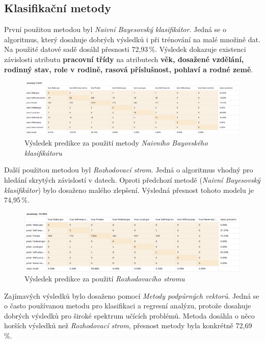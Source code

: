 \documentclass[11pt,a4paper,titlepage]{article}
\begin{document}
        \subsection{Klasifikační metody}
            První použitou metodou byl \textit{Naivní Bayesovský klasifikátor}. Jedná se o algoritmus, který dosahuje dobrých výsledků i při trénování na malé množině dat. Na použité datové sadě dosáhl přesnosti 72,93\,\%. Výsledek dokazuje existenci závislosti atributu \textbf{pracovní třídy} na atributech \textbf{věk, dosažené vzdělání, rodinný stav, role v rodině, rasová příslušnost, pohlaví a rodné země}.
            
            \begin{figure}[H]
                \centering
                \includegraphics[width=1\textwidth]{./img/bayes_novy.png}
                \caption{Výsledek predikce za použití metody \textit{Naivního Bayovského klasifikátoru}}
            \end{figure}

            Další použitou metodou byl \textit{Rozhodovací strom}. Jedná o algoritmus vhodný pro hledání skrytých závislostí v datech. Oproti předchozí metodě (\textit{Naivní Bayesovský klasifikátor}) bylo dosaženo malého zlepšení. Výsledná přesnost tohoto modelu je 74,95\,\%.
            
            \begin{figure}[H]
                \centering
                \includegraphics[width=1\textwidth]{./img/presnost_tree.png}
                \caption{Výsledek predikce za použití \textit{Rozhodovacího stromu}}
            \end{figure}

            Zajímavých výsledků bylo dosaženo pomocí \textit{Metody podpůrných vektorů}. Jedná se o často používanou metodu pro klasifikaci a regresní analýzu, protože dosahuje dobrých výsledků pro široké spektrum učících problémů. Metoda dosáhla o něco horších výsledků než \textit{Rozhodovací strom}, přesnost metody byla konkrétně 72,69\,\%.
\end{document}
